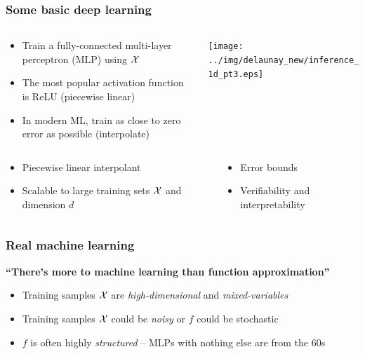 \documentclass[aspectratio=169]{beamer}
\newcommand{\cmark}{\ding{51}}
\newcommand{\xmark}{\ding{55}}
\begin{document}
\begin{frame}
\frametitle{Some basic deep learning}
\begin{columns}
\begin{column}{0.5\textwidth}
\begin{itemize}
\item Train a fully-connected multi-layer perceptron (MLP) using ${\cal X}$
\item The most popular activation function is ReLU (piecewise linear)
\item In modern ML, train as close to zero error as possible (interpolate)
\end{itemize}
\end{column}

\begin{column}{0.5\textwidth}
\pause
\begin{center}
\texttt{[image: ../img/delaunay\_new/inference\_1d\_pt3.eps]}
\end{center}
\end{column}
\end{columns}

\begin{columns}
\begin{column}{0.5\textwidth}
\begin{itemize}
\item Piecewise linear interpolant
\hskip 4pt{\color{green} \cmark}
\pause\item Scalable to large training sets ${\cal X}$ and dimension $d$
\hskip 4pt{\color{green} \cmark}
\end{itemize}
\end{column}
\begin{column}{0.5\textwidth}
\begin{itemize}
\pause\item Error bounds
\hskip 4pt{\color{red} \xmark}
\pause\item Verifiability and interpretability
\hskip 4pt{\color{red} \xmark}
\end{itemize}
\end{column}
\end{columns}
\end{frame}

\begin{frame}
\frametitle{Real machine learning}

\begin{center}
{\large \bf ``There's more to machine learning than function approximation''}
\end{center}


\pause
\bigskip

\begin{itemize}
\item Training samples ${\cal X}$ are {\sl high-dimensional} and {\sl mixed-variables}
\item Training samples ${\cal X}$ could be {\sl noisy} or $f$ could be stochastic
\item $f$ is often highly {\sl structured} -- MLPs with nothing else are from the 60s
\end{itemize}

\end{frame}
\end{document}
